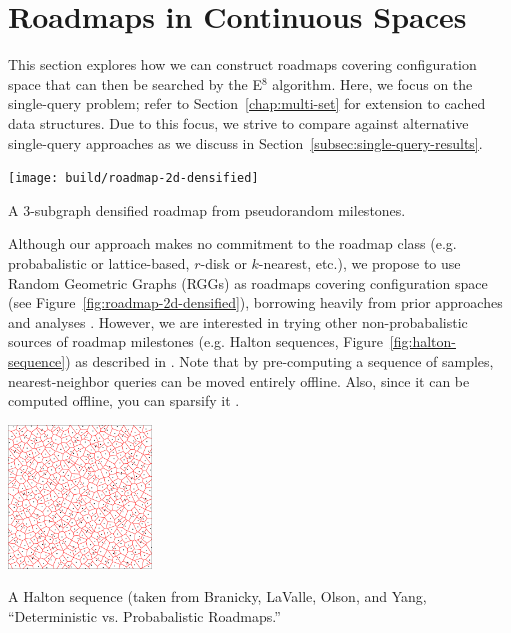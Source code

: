 \clearpage
\section{Roadmaps in Continuous Spaces}
\label{chap:graphs-in-continuous}

This section explores how we can construct roadmaps covering
configuration space that can then be searched by the E$^8$ algorithm.
Here,
we focus on the single-query problem;
refer to Section~\ref{chap:multi-set}
for extension to cached data structures.
Due to this focus,
we strive to compare against alternative single-query approaches
as we discuss in Section~\ref{subsec:single-query-results}.

\begin{marginfigure}
   \centering
   \texttt{[image: build/roadmap-2d-densified]}
   \caption{A 3-subgraph densified roadmap from pseudorandom
      milestones.}
   \label{fig:roadmap-2d-densified}
\end{marginfigure}

Although
our approach makes no commitment to the roadmap class
(e.g. probabalistic or lattice-based,
$r$-disk or $k$-nearest, etc.),
we propose to use Random Geometric Graphs (RGGs)
as roadmaps covering configuration space
(see Figure~\ref{fig:roadmap-2d-densified}),
borrowing heavily from prior approaches \citep{kavrakietal1996prm}
and analyses \citep{karaman2011samplingoptimal}.
However, we are interested in trying other non-probabalistic
sources of roadmap milestones
(e.g. Halton sequences, Figure~\ref{fig:halton-sequence})
as described in \citep{lavalle2004deterministic}.
Note that by pre-computing a sequence of samples,
nearest-neighbor queries can be moved entirely offline.
Also,
since it can be computed offline,
you can sparsify it \citep{shaharabani2013sparsification}.

\begin{marginfigure}
   \centering
   \includegraphics[width=1.5in]{figs/halton.png}
   \caption{A Halton sequence
      (taken from Branicky, LaValle, Olson, and Yang,
      ``Deterministic vs. Probabalistic Roadmaps.''}
   \label{fig:halton-sequence}
\end{marginfigure}

